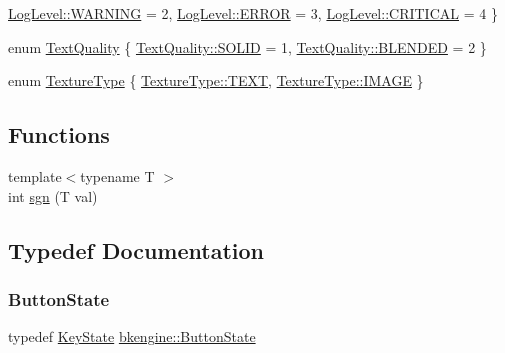 \begin{DoxyCompactItemize}
\hyperlink{namespacebkengine_ac7af143866047996624d81c55cc60bb7a059e9861e0400dfbe05c98a841f3f96b}{Log\+Level\+::\+W\+A\+R\+N\+I\+NG} = 2, 
\hyperlink{namespacebkengine_ac7af143866047996624d81c55cc60bb7abb1ca97ec761fc37101737ba0aa2e7c5}{Log\+Level\+::\+E\+R\+R\+OR} = 3, 
\newline
\hyperlink{namespacebkengine_ac7af143866047996624d81c55cc60bb7a99cd1c61610c76a57cb8d10d6df6b870}{Log\+Level\+::\+C\+R\+I\+T\+I\+C\+AL} = 4
 \}
\item 
enum \hyperlink{namespacebkengine_ad77befbc22a090a1182e5424b10670e4}{Text\+Quality} \{ \hyperlink{namespacebkengine_ad77befbc22a090a1182e5424b10670e4ad0dea69649a83749aa6bdf176092e8c9}{Text\+Quality\+::\+S\+O\+L\+ID} = 1, 
\hyperlink{namespacebkengine_ad77befbc22a090a1182e5424b10670e4a3ba39f6fa64f612db49d92e6f893d098}{Text\+Quality\+::\+B\+L\+E\+N\+D\+ED} = 2
 \}
\item 
enum \hyperlink{namespacebkengine_abb352d798cd1dda2ed0ec4ecc49f0037}{Texture\+Type} \{ \hyperlink{namespacebkengine_abb352d798cd1dda2ed0ec4ecc49f0037a61a96ffcb251bb9bf0abf8fec19d0ea8}{Texture\+Type\+::\+T\+E\+XT}, 
\hyperlink{namespacebkengine_abb352d798cd1dda2ed0ec4ecc49f0037a23a12f67f614b5518c7f1c2465bf95e3}{Texture\+Type\+::\+I\+M\+A\+GE}
 \}
\end{DoxyCompactItemize}
\subsection*{Functions}
\begin{DoxyCompactItemize}
\item 
{\footnotesize template$<$typename T $>$ }\\int \hyperlink{namespacebkengine_a4edd486632f9b4f8c742db4d9209f72c}{sgn} (T val)
\end{DoxyCompactItemize}


\subsection{Typedef Documentation}
\mbox{\label{namespacebkengine_a205072b2a91b1d8f00890857eec156d1}} 
\subsubsection{\texorpdfstring{Button\+State}{ButtonState}}
{\footnotesize\ttfamily typedef \hyperlink{namespacebkengine_a98437a3b234dfae2c61231b4737d0834}{Key\+State} \hyperlink{namespacebkengine_a98437a3b234dfae2c61231b4737d0834}{bkengine\+::\+Button\+State}}



